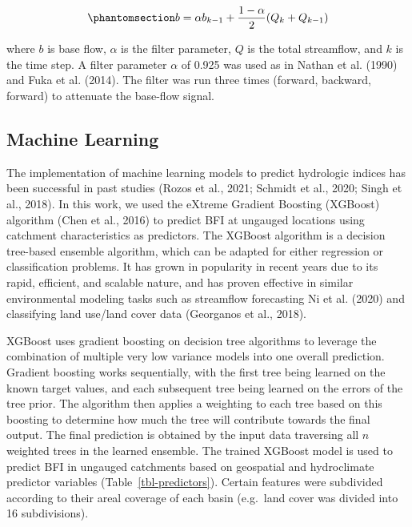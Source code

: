 \documentclass[
]{agujournal2019}
\begin{document}
\begin{equation}\phantomsection\label{eq-bf-separate}{
b = \alpha b_{k-1} + \frac{1-\alpha}{2}(Q_k + Q_{k-1})
}\end{equation}

where \(b\) is base flow, \(\alpha\) is the filter parameter, \(Q\) is
the total streamflow, and \(k\) is the time step. A filter parameter
\(\alpha\) of 0.925 was used as in Nathan et al. (1990) and Fuka et al.
(2014). The filter was run three times (forward, backward, forward) to
attenuate the base-flow signal.

\subsection{Machine Learning}\label{machine-learning}

The implementation of machine learning models to predict hydrologic
indices has been successful in past studies (Rozos et al., 2021; Schmidt
et al., 2020; Singh et al., 2018). In this work, we used the eXtreme
Gradient Boosting (XGBoost) algorithm (Chen et al., 2016) to predict BFI
at ungauged locations using catchment characteristics as predictors. The
XGBoost algorithm is a decision tree-based ensemble algorithm, which can
be adapted for either regression or classification problems. It has
grown in popularity in recent years due to its rapid, efficient, and
scalable nature, and has proven effective in similar environmental
modeling tasks such as streamflow forecasting Ni et al. (2020) and
classifying land use/land cover data (Georganos et al., 2018).

XGBoost uses gradient boosting on decision tree algorithms to leverage
the combination of multiple very low variance models into one overall
prediction. Gradient boosting works sequentially, with the first tree
being learned on the known target values, and each subsequent tree being
learned on the errors of the tree prior. The algorithm then applies a
weighting to each tree based on this boosting to determine how much the
tree will contribute towards the final output. The final prediction is
obtained by the input data traversing all \(n\) weighted trees in the
learned ensemble. The trained XGBoost model is used to predict BFI in
ungauged catchments based on geospatial and hydroclimate predictor
variables (Table~\ref{tbl-predictors}). Certain features were subdivided
according to their areal coverage of each basin (e.g.~land cover was
divided into 16 subdivisions).
\end{document}
